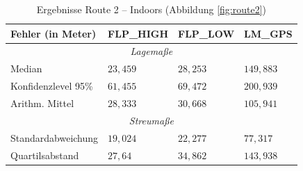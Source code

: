 \begin{table}[h!]
	\centering
	\caption{Ergebnisse Route 2 -- Indoors (Abbildung \ref{fig:route2})}
	\begin{tabular}{|l|l|l|l|}
	\hline
	Fehler (in Meter) & FLP\_HIGH & FLP\_LOW & LM\_GPS \\
	\hline
	\multicolumn{4}{|c|}{\textit{Lagemaße}}\\
	\hline
	Median & $23,459$ & $28,253$ & $149,883$ \\
	Konfidenzlevel 95\% & $61,455$ & $69,472$ & $200,939$ \\
	Arithm. Mittel & $28,333$ & $30,668$ & $105,941$ \\
	\hline
	\multicolumn{4}{|c|}{\textit{Streumaße}}\\
	\hline
	Standardabweichung & $19,024$ & $22,277$ & $77,317$ \\
	Quartilsabstand & $27,64$ & $34,862$ & $143,938$ \\
	\hline
	\end{tabular}
\end{table}
	

